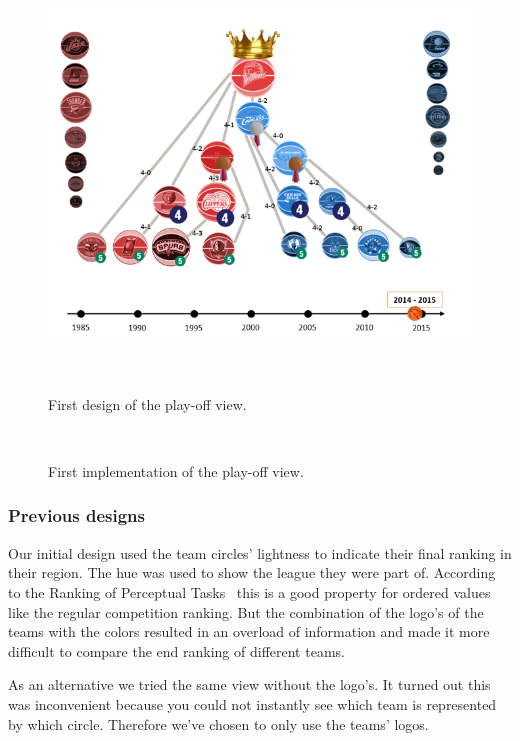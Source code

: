 \documentclass[chi_draft]{sigchi}
\begin{document}
\begin{figure}
\centering
  \includegraphics[width=1.0\columnwidth]{figures/playoffviewfirstdesign}
  \caption{First design of the play-off view.}~\label{fig:firstdesignplayoffview}
\end{figure}

\begin{figure}
\centering
  \missingfigure{}
  \caption{First implementation of the play-off view.}~\label{fig:firstimplementationplayoffview}
\end{figure}


\subsubsection{Previous designs}
Our initial design used the team circles' lightness to indicate their final
ranking in their region. The hue was used to show the league they were part of.
According to the Ranking of Perceptual Tasks~\cite{automatingdesign} this is a
good property for ordered values like the regular competition ranking. But the
combination of the logo's of the teams with the colors resulted in an overload
of information and made it more difficult to compare the end ranking of
different teams. 

As an alternative we tried the same view without the logo's. It turned out this 
was inconvenient because you could not instantly see which team is represented 
by which circle. Therefore we've chosen to only use the teams' logos.
\end{document}
